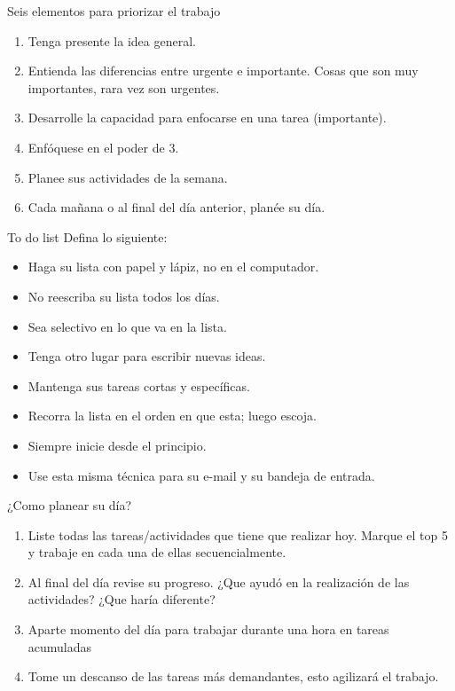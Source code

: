 \documentclass[
10pt,
aspectratio=169,
]{beamer}
\begin{document}
\begin{frame}[c]{Seis elementos para priorizar el trabajo}
\begin{enumerate}
\item Tenga presente la idea general.
\item Entienda las diferencias entre urgente e importante. Cosas que son muy importantes, rara vez son urgentes.
\item Desarrolle la capacidad para enfocarse en una tarea (importante).
\item Enf\'oquese en el poder de 3.
\item Planee sus actividades de la semana.
\item Cada ma\~nana o al final del d\'ia anterior, plan\'ee su d\'ia.  
\end{enumerate}
\end{frame}

\begin{frame}[c]{To do list}
Defina lo siguiente:
\begin{itemize}
\item Haga su lista con papel y l\'apiz, no en el computador.
\item No reescriba su lista todos los d\'ias.
\item Sea selectivo en lo que va en la lista.
\item Tenga otro lugar para escribir nuevas ideas.
\item Mantenga sus tareas cortas y espec\'ificas.
\item Recorra la lista en el orden en que esta; luego escoja.
\item Siempre inicie desde el principio.
\item Use esta misma t\'ecnica para su e-mail y su bandeja de entrada. 
\end{itemize}
\end{frame}

\begin{frame}[c]{¿Como planear su d\'ia?}
\begin{enumerate}
\item Liste todas las tareas/actividades que tiene que realizar hoy. Marque el top 5 y trabaje en cada una de ellas secuencialmente. 
\item Al final del d\'ia revise su progreso. ¿Que ayud\'o en la realizaci\'on de las actividades? ¿Que har\'ia diferente?
\item Aparte momento del d\'ia para trabajar durante una hora en tareas acumuladas
\item Tome un descanso de las tareas m\'as demandantes, esto agilizar\'a el trabajo. 
\end{enumerate}
\end{frame}
\end{document}
